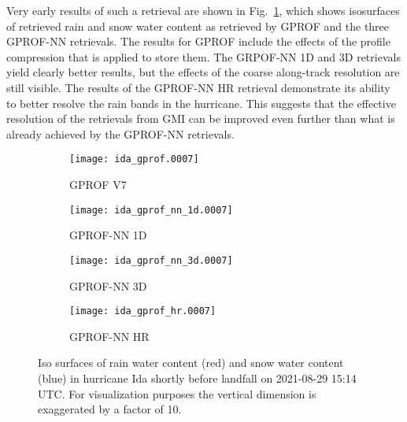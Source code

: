 Very early results of such a retrieval are shown in
Fig.~\ref{fig:contributions:gprof_nn_hr}, which shows isosurfaces of retrieved
rain and snow water content as retrieved by GPROF and the three GPROF-NN
retrievals. The results for GPROF include the effects of the profile compression
that is applied to store them. The GRPOF-NN 1D and 3D retrievals yield clearly
better results, but the effects of the coarse along-track resolution are still
visible. The results of the GPROF-NN HR retrieval demonstrate its ability to
better resolve the rain bands in the hurricane. This suggests that the effective
resolution of the retrievals from GMI can be improved even further than what is
already achieved by the GPROF-NN retrievals.


\begin{figure}
  \centering
  \begin{subfigure}[b]{0.49\textwidth}
    \centering
    \texttt{[image: ida\_gprof.0007]}
    \caption{GPROF V7}
  \end{subfigure}
  \hfill
  \begin{subfigure}[b]{0.49\textwidth}
    \centering
    \texttt{[image: ida\_gprof\_nn\_1d.0007]}
    \caption{GPROF-NN 1D}
  \end{subfigure}
  \begin{subfigure}[b]{0.49\textwidth}
    \centering
    \texttt{[image: ida\_gprof\_nn\_3d.0007]}
    \caption{GPROF-NN 3D}
  \end{subfigure}
  \hfill
  \begin{subfigure}[b]{0.49\textwidth}
    \centering
    \texttt{[image: ida\_gprof\_hr.0007]}
    \caption{GPROF-NN HR}
  \end{subfigure}
  \caption{
    Iso surfaces of rain water content (red) and snow water content (blue) in hurricane Ida
    shortly before landfall on 2021-08-29 15:14 UTC. For visualization purposes the
    vertical dimension is exaggerated by a factor of 10.
  }
  \label{fig:contributions:gprof_nn_hr}
\end{figure}


